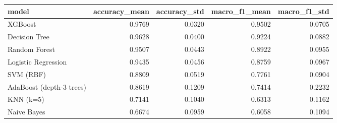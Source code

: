 \begin{tabular}{lrrrr}
\toprule
model & accuracy_mean & accuracy_std & macro_f1_mean & macro_f1_std \\
\midrule
XGBoost & 0.9769 & 0.0320 & 0.9502 & 0.0705 \\
Decision Tree & 0.9628 & 0.0400 & 0.9224 & 0.0882 \\
Random Forest & 0.9507 & 0.0443 & 0.8922 & 0.0955 \\
Logistic Regression & 0.9435 & 0.0456 & 0.8759 & 0.0967 \\
SVM (RBF) & 0.8809 & 0.0519 & 0.7761 & 0.0904 \\
AdaBoost (depth-3 trees) & 0.8619 & 0.1209 & 0.7414 & 0.2232 \\
KNN (k=5) & 0.7141 & 0.1040 & 0.6313 & 0.1162 \\
Naive Bayes & 0.6674 & 0.0959 & 0.6058 & 0.1094 \\
\bottomrule
\end{tabular}
